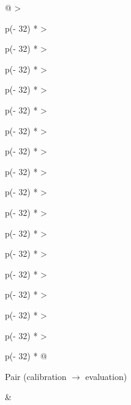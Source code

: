 \documentclass[11pt,letterpaper]{article}
\begin{document}
\begin{landscape}{\scriptsize\setlength{\tabcolsep}{2.5pt}\begin{longtable}[]{@{}
  >{\raggedright\arraybackslash}p{(\columnwidth - 32\tabcolsep) * }
  >{\raggedright\arraybackslash}p{(\columnwidth - 32\tabcolsep) * }
  >{\raggedright\arraybackslash}p{(\columnwidth - 32\tabcolsep) * }
  >{\raggedright\arraybackslash}p{(\columnwidth - 32\tabcolsep) * }
  >{\raggedright\arraybackslash}p{(\columnwidth - 32\tabcolsep) * }
  >{\raggedright\arraybackslash}p{(\columnwidth - 32\tabcolsep) * }
  >{\raggedright\arraybackslash}p{(\columnwidth - 32\tabcolsep) * }
  >{\raggedright\arraybackslash}p{(\columnwidth - 32\tabcolsep) * }
  >{\raggedright\arraybackslash}p{(\columnwidth - 32\tabcolsep) * }
  >{\raggedright\arraybackslash}p{(\columnwidth - 32\tabcolsep) * }
  >{\raggedright\arraybackslash}p{(\columnwidth - 32\tabcolsep) * }
  >{\raggedright\arraybackslash}p{(\columnwidth - 32\tabcolsep) * }
  >{\raggedright\arraybackslash}p{(\columnwidth - 32\tabcolsep) * }
  >{\raggedright\arraybackslash}p{(\columnwidth - 32\tabcolsep) * }
  >{\raggedright\arraybackslash}p{(\columnwidth - 32\tabcolsep) * }
  >{\raggedright\arraybackslash}p{(\columnwidth - 32\tabcolsep) * }
  >{\raggedright\arraybackslash}p{(\columnwidth - 32\tabcolsep) * }@{}}
\caption*{\textbf{Table D4c.} Study 3, T1: the inconsistent and unresolved rows with the protocol's diagnostics (every one under the raw rule). Extracted verbatim from the Study 3 report's generated Table 3 (block \texttt{t1\_\allowbreak{}failures} of \texttt{outputs/\allowbreak{}study3\_\allowbreak{}v0.\allowbreak{}1/\allowbreak{}report/\allowbreak{}tables.\allowbreak{}md}, written by the report builder from the locked record and agreed at checkpoint R08); the report's own column note follows the table. This table is set in 2 column panels; its identifying columns 1--5 (Pair (calibration \ensuremath{\rightarrow} evaluation), Tokenizer, Rule, h, N\_cal) identify every row and are repeated in each panel; this panel holds columns 1--17 of 24.}\tabularnewline
\toprule\noalign{}
\begin{minipage}[b]{\linewidth}\raggedright
Pair (calibration \ensuremath{\rightarrow} evaluation)
\end{minipage} & \begin{minipage}[b]{\linewidth}\raggedright

\end{minipage}
\end{longtable}}
\end{landscape}
\end{document}
